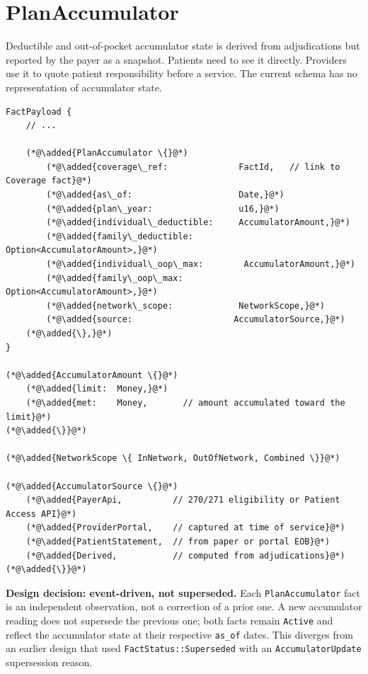 \documentclass[11pt]{article}
\newcommand{\added}[1]{\textcolor{accentblue}{#1}}
\begin{document}
\section{PlanAccumulator}
\label{sec:accumulator}

Deductible and out-of-pocket accumulator state is derived from
adjudications but reported by the payer as a snapshot. Patients need to
see it directly. Providers use it to quote patient responsibility before
a service. The current schema has no representation of accumulator state.

\begin{lstlisting}
FactPayload {
    // ...

    (*@\added{PlanAccumulator \{}@*)
        (*@\added{coverage\_ref:              FactId,   // link to Coverage fact}@*)
        (*@\added{as\_of:                     Date,}@*)
        (*@\added{plan\_year:                 u16,}@*)
        (*@\added{individual\_deductible:     AccumulatorAmount,}@*)
        (*@\added{family\_deductible:         Option<AccumulatorAmount>,}@*)
        (*@\added{individual\_oop\_max:        AccumulatorAmount,}@*)
        (*@\added{family\_oop\_max:            Option<AccumulatorAmount>,}@*)
        (*@\added{network\_scope:             NetworkScope,}@*)
        (*@\added{source:                    AccumulatorSource,}@*)
    (*@\added{\},}@*)
}

(*@\added{AccumulatorAmount \{}@*)
    (*@\added{limit:  Money,}@*)
    (*@\added{met:    Money,       // amount accumulated toward the limit}@*)
(*@\added{\}}@*)

(*@\added{NetworkScope \{ InNetwork, OutOfNetwork, Combined \}}@*)

(*@\added{AccumulatorSource \{}@*)
    (*@\added{PayerApi,          // 270/271 eligibility or Patient Access API}@*)
    (*@\added{ProviderPortal,    // captured at time of service}@*)
    (*@\added{PatientStatement,  // from paper or portal EOB}@*)
    (*@\added{Derived,           // computed from adjudications}@*)
(*@\added{\}}@*)
\end{lstlisting}

\textbf{Design decision: event-driven, not superseded.} Each
\texttt{PlanAccumulator} fact is an independent observation, not a
correction of a prior one. A new accumulator reading does not supersede
the previous one; both facts remain \texttt{Active} and reflect the
accumulator state at their respective \texttt{as\_of} dates. This
diverges from an earlier design that used
\texttt{FactStatus::Superseded} with an \texttt{AccumulatorUpdate}
supersession reason.
\end{document}
